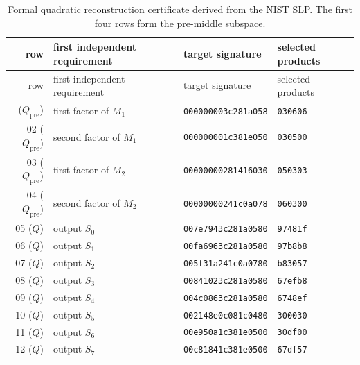 \begin{longtable}{@{}r>{\raggedright\arraybackslash}p{}ll@{}}
\caption{Formal quadratic reconstruction certificate derived from the NIST SLP. The first four rows form the pre-middle subspace.}\label{tab:targets}\\
\toprule
row & first independent requirement & target signature & selected products \\
\midrule
\endfirsthead
\toprule
row & first independent requirement & target signature & selected products \\
\midrule
\endhead
\bottomrule
\endfoot
01 ($Q_{\mathrm{pre}}$) & first factor of $M_1$ & \texttt{000000003c281a058} & \texttt{030606} \\
02 ($Q_{\mathrm{pre}}$) & second factor of $M_1$ & \texttt{000000001c381e050} & \texttt{030500} \\
03 ($Q_{\mathrm{pre}}$) & first factor of $M_2$ & \texttt{00000000281416030} & \texttt{050303} \\
04 ($Q_{\mathrm{pre}}$) & second factor of $M_2$ & \texttt{00000000241c0a078} & \texttt{060300} \\
05 ($Q$) & output $S_0$ & \texttt{007e7943c281a0580} & \texttt{97481f} \\
06 ($Q$) & output $S_1$ & \texttt{00fa6963c281a0580} & \texttt{97b8b8} \\
07 ($Q$) & output $S_2$ & \texttt{005f31a241c0a0780} & \texttt{b83057} \\
08 ($Q$) & output $S_3$ & \texttt{00841023c281a0580} & \texttt{67efb8} \\
09 ($Q$) & output $S_4$ & \texttt{004c0863c281a0580} & \texttt{6748ef} \\
10 ($Q$) & output $S_5$ & \texttt{002148e0c081c0480} & \texttt{300030} \\
11 ($Q$) & output $S_6$ & \texttt{00e950a1c381e0500} & \texttt{30df00} \\
12 ($Q$) & output $S_7$ & \texttt{00c81841c381e0500} & \texttt{67df57} \\
\end{longtable}
